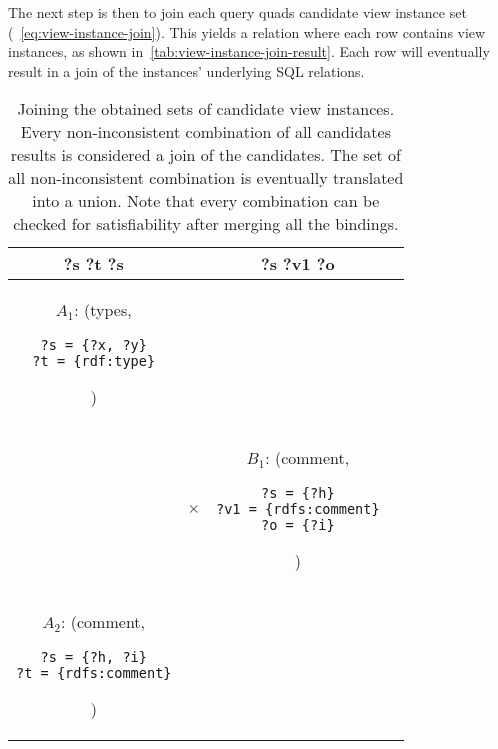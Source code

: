 \documentclass[a4paper,twoside,bibtotoc,abstracton,12pt,BCOR=15mm]{scrreprt}
\begin{document}
The next step is then to join each query quads candidate view instance set (~\autoref{eq:view-instance-join}). This yields a relation where each row contains view instances,
as shown in~\autoref{tab:view-instance-join-result}.
Each row will eventually result in a join of the instances' underlying SQL relations.



\begin{table}[!h]
\centering
\begin{tabular}{cccc}
\toprule
\textbf{?s ?t ?s} & & \textbf{?s ?v1 ?o} \\
\midrule

$A_1$: (types,
\begin{minipage}{3cm}
\begin{scriptsize}
\begin{verbatim}
?s = {?x, ?y}
?t = {rdf:type}
\end{verbatim}
\end{scriptsize}
\end{minipage}
)

&
&


\\

&
$\times$
&

$B_1$: (comment,
\begin{minipage}{3cm}
\begin{scriptsize}
\begin{verbatim}
?s = {?h}
?v1 = {rdfs:comment}
?o = {?i}
\end{verbatim}
\end{scriptsize}
\end{minipage}
)


\\

$A_2$: (comment,
\begin{minipage}{3cm}
\begin{scriptsize}
\begin{verbatim}
?s = {?h, ?i}
?t = {rdfs:comment}
\end{verbatim}
\end{scriptsize}
\end{minipage}
)

& 
&


\\
\bottomrule
\end{tabular}
\caption{Joining the obtained sets of candidate view instances. Every non-inconsistent combination of all candidates results is considered a join of the candidates. The set of all non-inconsistent combination is eventually translated into a union. Note that every combination can be checked for satisfiability after merging all the bindings.}
\label{tab:view-instance-join}
\end{table}
\end{document}
